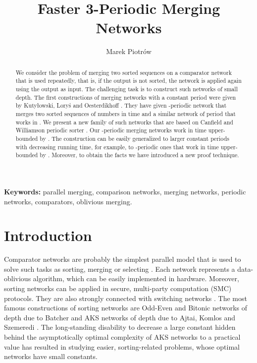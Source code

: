 \documentclass{llncs}
\title{Faster 3-Periodic Merging Networks}
\author{Marek Piotr\'ow}
\institute{Institute of Computer Science, University of Wroc\l aw,\\ 
ul.~Joliot-Curie~15, PL-50-383 Wroc\l aw, Poland\\
\email{Marek.Piotrow@ii.uni.wroc.pl}}
\begin{document}
\maketitle

\begin{abstract} We consider the problem of merging two sorted sequences on a comparator
network that is used repeatedly, that is, if the output is not sorted,
the network is applied again using the output as input. The challenging
task is to construct such networks of small depth. The first
constructions of merging networks with a constant period were given by
Kuty{\l}owski, Lory{\'s} and Oesterdikhoff \cite{klo}. They have given
-periodic network that merges two sorted sequences of  numbers in
time  and a similar network of period  that works in
.  We present a new family of such networks that are based
on Canfield and Williamson periodic sorter \cite{cw}. Our -periodic
merging networks work in time upper-bounded by . The construction
can be easily generalized to larger constant periods with decreasing
running time, for example, to -periodic ones that work in time 
upper-bounded by . Moreover, to obtain the facts we have introduced 
a new proof technique.
\end{abstract}

\medskip
\noindent\textbf{Keywords:} parallel merging, comparison networks, 
merging networks, periodic networks, comparators, oblivious merging.





\section{Introduction}  \label{intro}

Comparator networks are probably the simplest parallel model that is used to
solve such tasks as sorting, merging or selecting \cite{k}. Each network
represents a data-oblivious algorithm, which can be easily implemented in
hardware. Moreover, sorting networks can be applied in secure, multi-party
computation (SMC) protocols. They are also strongly connected with switching
networks \cite{l}. The most famous constructions of sorting networks are
Odd-Even and Bitonic networks of depth  due to Batcher
\cite{b} and AKS networks of depth  due to Ajtai, Komlos and
Szemeredi \cite{aks}. The long-standing disability to decrease a large
constant hidden behind the asymptotically optimal complexity of AKS networks
to a practical value \cite{s} has resulted in studying easier, sorting-related
problems, whose optimal networks have small constants.
\end{document}
